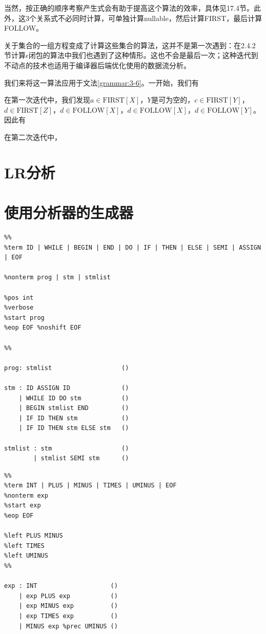 \documentclass[cn,11pt,chinese]{elegantbook}
\newenvironment{code}{\captionsetup{type=listing}}{}
\begin{document}
当然，按正确的顺序考察产生式会有助于提高这个算法的效率，具体见17.4节。此外，这3个关系式不必同时计算，可单独计算nullable，然后计算FIRST，最后计算FOLLOW。

关于集合的一组方程变成了计算这些集合的算法，这并不是第一次遇到：在2.4.2节计算$\epsilon$闭包的算法中我们也遇到了这种情形。这也不会是最后一次；这种迭代到不动点的技术也适用于编译器后端优化使用的数据流分析。

我们来将这一算法应用于文法\ref{grammar:3-6}。一开始，我们有

在第一次迭代中，我们发现$a\in\text{FIRST}[X]$，$Y$是可为空的，$c\in\text{FIRST}[Y]$，$d\in\text{FIRST}[Z]$，$d\in\text{FOLLOW}[X]$，$d\in\text{FOLLOW}[X]$，$d\in\text{FOLLOW}[Y]$。因此有

在第二次迭代中，

\section{LR分析}

\section{使用分析器的生成器}

\begin{code}
\label{grammar:3-31}
\begin{verbatim}
%%
%term ID | WHILE | BEGIN | END | DO | IF | THEN | ELSE | SEMI | ASSIGN | EOF

%nonterm prog | stm | stmlist

%pos int
%verbose
%start prog
%eop EOF %noshift EOF

%%

prog: stmlist                   ()

stm : ID ASSIGN ID              ()
    | WHILE ID DO stm           ()
    | BEGIN stmlist END         ()
    | IF ID THEN stm            ()
    | IF ID THEN stm ELSE stm   ()

stmlist : stm                   ()
        | stmlist SEMI stm      ()
\end{verbatim}
\end{code}

\begin{code}
\label{grammar:3-35}
\begin{verbatim}
%%
%term INT | PLUS | MINUS | TIMES | UMINUS | EOF
%nonterm exp
%start exp
%eop EOF

%left PLUS MINUS
%left TIMES
%left UMINUS
%%

exp : INT                    ()
    | exp PLUS exp           ()
    | exp MINUS exp          ()
    | exp TIMES exp          ()
    | MINUS exp %prec UMINUS ()
\end{verbatim}
\end{code}
\end{document}
